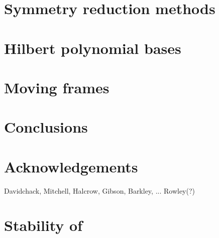 \documentclass[preprint,number,sort&compress]{elsarticle}
\begin{document}
   
   

\section{\label{s:symRedGeneral} Symmetry reduction methods}
    

\section{\label{s:Hilbert} Hilbert polynomial bases}
    

\section{\label{sec:mf} Moving frames}
    
    
    
    


\section{Conclusions}
    

\section*{Acknowledgements}
 Davidchack, Mitchell, Halcrow, Gibson, Barkley, ... Rowley(?)

\appendix

\section{\label{s:StabReq} Stability of \reqva}
    

% 



    \newpage
    
    
\end{document}
